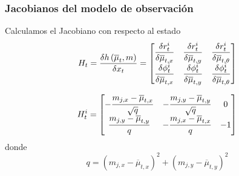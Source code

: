 \begin{frame}
    \frametitle{Jacobianos del modelo de observación}
    Calculamos el Jacobiano con respecto al estado
    \begin{equation*}
        H_{t} = \dfrac{\delta h\left( \overline{\mu}_{t},m \right)}{\delta x_{t}} =
        \begin{bmatrix}
            \dfrac{\delta r_{t}^{i}}{\delta \overline{\mu}_{t,x}} & \dfrac{\delta r_{t}^{i}}{\delta \overline{\mu}_{t,y}} & \dfrac{\delta r_{t}^{i}}{\delta \overline{\mu}_{t,\theta}}\\
            \dfrac{\delta \phi_{t}^{i}}{\delta \overline{\mu}_{t,x}} & \dfrac{\delta \phi_{t}^{i}}{\delta \overline{\mu}_{t,y}} & \dfrac{\delta \phi_{t}^{i}}{\delta \overline{\mu}_{t,\theta}}
        \end{bmatrix}
    \end{equation*}
    
    \begin{equation*}
        H_{t}^{i} = 
        \begin{bmatrix}
            -\dfrac{m_{j,x} - \overline{\mu}_{t,x}}{\sqrt{q}} & -\dfrac{m_{j,y} - \overline{\mu}_{t,y}}{\sqrt{q}}  & 0\\
            \dfrac{m_{j,y} - \overline{\mu}_{t,y}}{q}  & -\dfrac{m_{j,x} - \overline{\mu}_{t,x}}{q}  & -1
        \end{bmatrix}
    \end{equation*}
    donde
    \begin{equation*}
        q = (m_{j,x}-\overline{\mu}_{t,x})^{2} + (m_{j,y}-\overline{\mu}_{t,y})^{2}
    \end{equation*}
\end{frame}

